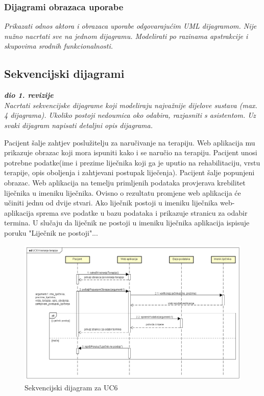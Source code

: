 				\subsubsection{Dijagrami obrazaca uporabe}
					
					\textit{Prikazati odnos aktora i obrazaca uporabe odgovarajućim UML dijagramom. Nije nužno nacrtati sve na jednom dijagramu. Modelirati po razinama apstrakcije i skupovima srodnih funkcionalnosti.}
				\eject		
				
			\subsection{Sekvencijski dijagrami}
				
				\textbf{\textit{dio 1. revizije}}\\
				
				\textit{Nacrtati sekvencijske dijagrame koji modeliraju najvažnije dijelove sustava (max. 4 dijagrama). Ukoliko postoji nedoumica oko odabira, razjasniti s asistentom. Uz svaki dijagram napisati detaljni opis dijagrama.}
				
				\textbf{}
				
				Pacijent šalje zahtjev poslužitelju za naručivanje na terapiju. Web aplikacija mu prikazuje obrazac koji mora ispuniti kako i se naručio na terapiju. Pacijent unosi potrebne podatke(ime i prezime liječnika koji ga je uputio na rehabilitaciju, vrstu terapije, opis oboljenja i zahtjevani postupak liječenja). Pacijent šalje popunjeni obrazac. Web aplikacija na temelju primljenih podataka provjerava krebilitet liječnika u imeniku liječnika. Ovisno o rezultatu promjene web aplikacija će učiniti jednu od dvije stvari. Ako liječnik postoji u imeniku liječnika web-aplikacija sprema sve podatke u bazu podataka i prikazuje stranicu za odabir termina. U slučaju da liječnik ne postoji u imeniku liječnika aplikacija ispisuje poruku "Liječnik ne postoji"...
				
				
				\begin{figure}[H]
					\includegraphics[scale=0.4]{slike/UC6_Kreiranje_terapije.PNG} %
					\centering
					\caption{Sekvencijski dijagram za UC6}
					\label{fig:booking}
				\end{figure}
				\eject
	
